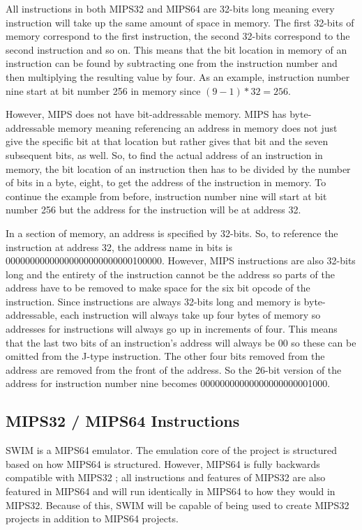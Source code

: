 \documentclass[parskip=half, fontsize=12pt]{scrartcl}
\begin{document}
All instructions in both MIPS32 and MIPS64 are 32-bits long \cite{brady-instruction-formats} meaning
every instruction will take up the same amount of space in memory. The
first 32-bits of memory correspond to the first instruction, the second
32-bits correspond to the second instruction and so on. This means that
the bit location in memory of an instruction can be found by subtracting
one from the instruction number and then multiplying the resulting value
by four. As an example, instruction number nine start at bit number 256
in memory since ${{({9 - 1})} \ast 32} = 256.$

However, MIPS does not have bit-addressable \cite{sciencedirect-addressable-memory} memory. MIPS has
byte-addressable memory meaning referencing an address in memory does
not just give the specific bit at that location but rather gives that
bit and the seven subsequent bits, as well. So, to find the actual
address of an instruction in memory, the bit location of an instruction
then has to be divided by the number of bits in a byte, eight, to get
the address of the instruction in memory. To continue the example from
before, instruction number nine will start at bit number 256 but the
address for the instruction will be at address 32.

In a section of memory, an address is specified by 32-bits. So, to
reference the instruction at address 32, the address name in bits is
00000000000000000000000000100000. However, MIPS instructions are also
32-bits long and the entirety of the instruction cannot be the address
so parts of the address have to be removed to make space for the six bit
opcode of the instruction. Since instructions are always 32-bits long
and memory is byte-addressable, each instruction will always take up
four bytes of memory so addresses for instructions will always go up in
increments of four. This means that the last two bits of an
instruction's address will always be 00 so these can be omitted from the
J-type instruction. The other four bits removed from the address are
removed from the front of the address. So the 26-bit version of the
address for instruction number nine becomes 00000000000000000000001000.

\subsection{MIPS32 / MIPS64 Instructions}

SWIM is a MIPS64 emulator. The emulation core of the project is
structured based on how MIPS64 is structured. However, MIPS64 is fully
backwards compatible with MIPS32 \cite{mips-specification}; all instructions and features of
MIPS32 are also featured in MIPS64 and will run identically in MIPS64 to
how they would in MIPS32. Because of this, SWIM will be capable of being
used to create MIPS32 projects in addition to MIPS64 projects.
\end{document}
